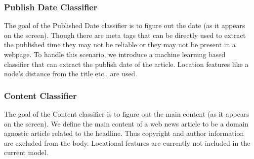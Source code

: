 \documentclass{article} %
\begin{document}
\subsubsection{Publish Date Classifier}
The goal of the Published Date classifier is to figure out the date (as it appears on the screen). Though there are meta tags that can be directly used to extract the published time they may not be reliable or they may not be present in a webpage. To handle this scenario, we introduce a machine learning based classifier that can extract the publish date of the article. Location features like a node's distance from the title etc., are used. 

\subsubsection{Content Classifier}
The goal of the Content classifier is to figure out the main content (as it appears on the screen). We define the main content of a web news article to be a domain agnostic article related to the headline. Thus copyright and  author information are excluded from the body. Locational features are currently not included in the current model. 




\end{document}
